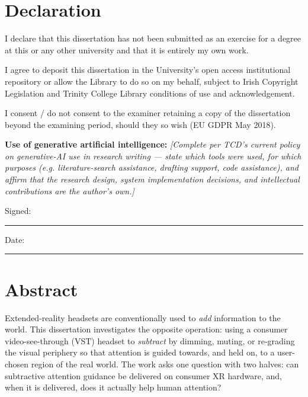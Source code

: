\section*{\Huge\textcolor{tcd_blue}{Declaration}}

I declare that this dissertation has not been submitted as an exercise for a degree at this or any
other university and that it is entirely my own work.

I agree to deposit this dissertation in the University's open access institutional repository or
allow the Library to do so on my behalf, subject to Irish Copyright Legislation and Trinity College
Library conditions of use and acknowledgement.

I consent / do not consent to the examiner retaining a copy of the dissertation beyond the examining
period, should they so wish (EU GDPR May 2018).

\textbf{Use of generative artificial intelligence:} \textit{[Complete per TCD's current policy on
generative-AI use in research writing — state which tools were used, for which purposes (e.g.
literature-search assistance, drafting support, code assistance), and affirm that the research
design, system implementation decisions, and intellectual contributions are the author's own.]}

\vspace{3cm}

Signed:~\rule{5cm}{0.3pt}\hfill Date:~\rule{5cm}{0.3pt}

\newpage

\section*{\Huge\textcolor{tcd_blue}{Abstract}}

Extended-reality headsets are conventionally used to \textit{add} information to the world. This
dissertation investigates the opposite operation: using a consumer video-see-through (VST) headset to
\textit{subtract} by dimming, muting, or re-grading the visual periphery so that attention is guided towards,
and held on, to a user-chosen region of the real world. The work asks one question with two halves: can
subtractive attention guidance be delivered on consumer XR hardware, and, when it is delivered, does
it actually help human attention?

